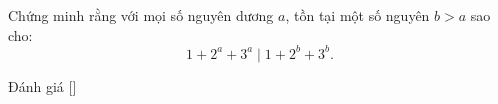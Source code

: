 \ifshowproblem
\begin{problem}\label{problem:POL-2015-MO2-P6}
    Chứng minh rằng với mọi số nguyên dương \( a \), tồn tại một số nguyên \( b > a \) sao cho:
    \[
        1 + 2^a + 3^a \mid 1 + 2^b + 3^b.
    \]    
\end{problem}
\fi

\ifshowinfo
Đánh giá [\textbf{}]\footnotemark
{}
\fi